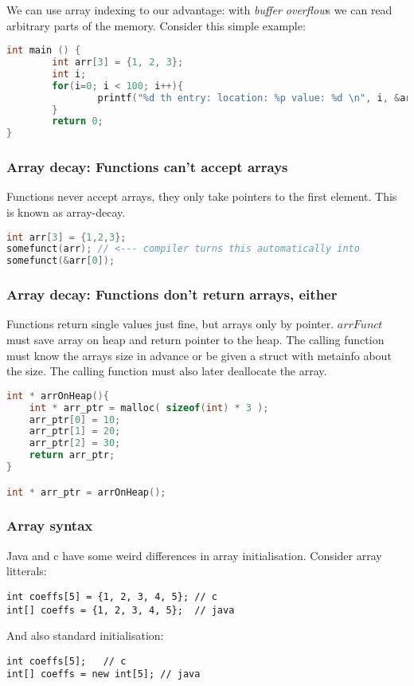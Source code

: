 We can use array indexing to our advantage: with \emph{buffer overflow}s we can read arbitrary parts of the memory. 
Consider this simple example:

\begin{lstlisting}[language=c]
   int main () {
        int arr[3] = {1, 2, 3};
        int i;
        for(i=0; i < 100; i++){
                printf("%d th entry: location: %p value: %d \n", i, &arr[i], arr[i]);
        }
        return 0;
} 
\end{lstlisting}


\subsubsection{Array decay: Functions can't accept arrays}

Functions never accept arrays, they only take pointers to the first element. This is known as array-decay.

\begin{lstlisting}[language=c]
int arr[3] = {1,2,3};
somefunct(arr); // <--- compiler turns this automatically into 
somefunct(&arr[0]);
\end{lstlisting}


\subsubsection{Array decay: Functions don't return arrays, either}

Functions return single values just fine, but arrays only by pointer. 
$arrFunct$ must save array on heap and return pointer to the heap.
The calling function must know the arrays size in advance or be given a struct with metainfo about the size.
The calling function must also later deallocate the array.

\begin{lstlisting}[language=c]
int * arrOnHeap(){
    int * arr_ptr = malloc( sizeof(int) * 3 );
    arr_ptr[0] = 10;
    arr_ptr[1] = 20;
    arr_ptr[2] = 30;
    return arr_ptr;
}

int * arr_ptr = arrOnHeap();
\end{lstlisting}


\subsubsection{Array syntax} 
Java and c have some weird differences in array initialisation. Consider array litterals: 
\begin{lstlisting}
int coeffs[5] = {1, 2, 3, 4, 5}; // c
int[] coeffs = {1, 2, 3, 4, 5};  // java
\end{lstlisting}
And also standard initialisation:
\begin{lstlisting}
int coeffs[5];   // c
int[] coeffs = new int[5]; // java
\end{lstlisting}


